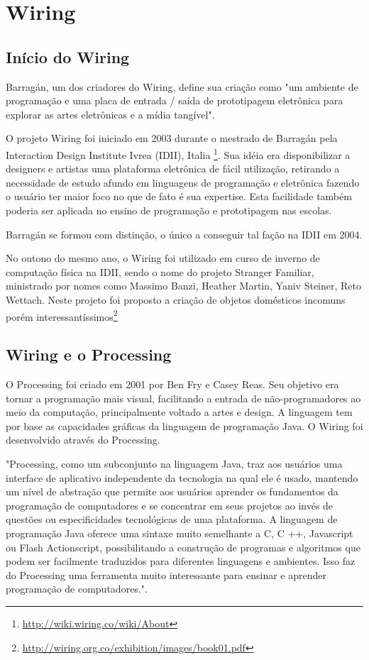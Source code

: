 \section[Wiring]{Wiring}

\subsection{Início do Wiring}
Barragán, um dos criadores do Wiring, define sua criação como "um ambiente de programação e uma placa de entrada / saída de prototipagem eletrônica para explorar as artes eletrônicas e a mídia tangível"\cite{Barragan2004}.

O projeto Wiring foi iniciado em 2003 durante o mestrado de Barragán pela Interaction Design Institute Ivrea (IDII), Italia \footnote{\url{http://wiki.wiring.co/wiki/About}}. Sua idéia era disponibilizar a designers e artistas uma plataforma eletrônica de fácil utilização, retirando a necessidade de estudo afundo em linguagens de programação e eletrônica fazendo o usuário ter maior foco no que de fato é sua expertise. Esta facilidade também poderia ser aplicada no ensino de programação e prototipagem nas escolas.

Barragán se formou com distinção, o único a conseguir tal fação na IDII em 2004.

No outono do mesmo ano, o Wiring foi utilizado em curso de inverno de computação física na IDII, sendo o nome do projeto Stranger Familiar, ministrado por nomes como Massimo Banzi, Heather Martin, Yaniv Steiner, Reto Wettach. Neste projeto foi proposto a criação de objetos domésticos incomuns porém interessantíssimos\footnote{\url{http://wiring.org.co/exhibition/images/book01.pdf}}

\subsection{Wiring e o Processing}

O Processing foi criado em 2001 por Ben Fry e Casey Reas. Seu objetivo era tornar a programação mais visual, facilitando a entrada de não-programadores ao meio da computação, principalmente voltado a artes e design.\cite{reas2007processing} A linguagem tem por base as capacidades gráficas da linguagem de programação Java. O Wiring foi desenvolvido através do Processing.

"Processing, como um subconjunto na linguagem Java, traz aos usuários uma interface de aplicativo independente da tecnologia na qual ele é usado, mantendo um nível de abstração que permite aos usuários aprender os fundamentos da programação de computadores e se concentrar em seus projetos ao invés de questões ou especificidades tecnológicas de uma plataforma. A linguagem de programação Java oferece uma sintaxe muito semelhante a C, C ++, Javascript ou Flash Actionscript, possibilitando a construção de programas e algoritmos que podem ser facilmente traduzidos para diferentes linguagens e ambientes. Isso faz do Processing uma ferramenta muito interessante para ensinar e aprender programação de computadores."\cite{Barragan2004}.

